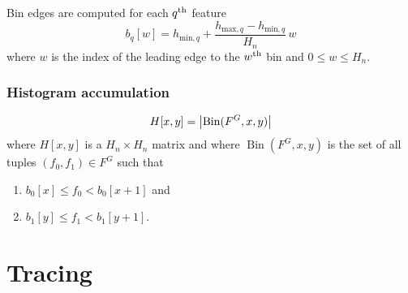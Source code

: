 \documentclass[12pt]{article}
\begin{document}
Bin edges are computed for each \(q^{\mathrm{th}}\) feature
\begin{dmath*}
	b_q[w] =
		h_{\mathrm{min},q} +
		\frac{ h_{\mathrm{max},q}  - h_{\mathrm{min},q}  }
		     { H_n } \, w
\end{dmath*}
where \(w\) is the index of the leading edge to the
\(w^{\mathrm{th}}\) bin and \( 0 \le w \le  H_n \).

\subsubsection{Histogram accumulation}

\begin{dmath*}
	H[x,y] =  \Dim{ \operatorname{Bin}(F^G, x, y) }
\end{dmath*}
where \(H[x,y]\) is a \(H_n \times H_n\) matrix and
where \(\operatorname{Bin}(F^G, x, y)\) is the set of all tuples
\((f_0, f_1) \in F^G\) such that
\begin{enumerate}
	\item \(b_0[x] \le f_0 < b_0[x+1]\) and
	\item \(b_1[y] \le f_1 < b_1[y+1]\).
\end{enumerate}



\section{Tracing}
\end{document}
